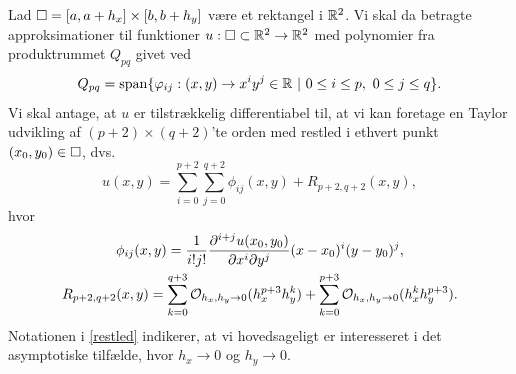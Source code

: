 Lad $\Box =[a,a+h_x]\times [b,b+h_y]$ være et rektangel i $\mathbb{R}^2$. Vi
skal da betragte approksimationer til funktioner $u:\Box\subset\mathbb{R}^2
\rightarrow \mathbb{R}^2$ med polynomier fra produktrummet $Q_{pq}$ givet ved
\begin{equation}
  Q_{pq} = \operatorname{span} \{\varphi_{ij} : (x,y)\rightarrow x^i y^j \in\mathbb{R} \ |\
  0\leq i\leq p, \ 0\leq j\leq q \}.
\end{equation}
Vi skal antage, at $u$ er tilstrækkelig differentiabel til, at vi kan
foretage en Taylor udvikling af $(p+2)\times(q+2)$'te orden med restled i
ethvert punkt $(x_0,y_0)\in\Box$, dvs.
\begin{equation}
  u(x,y) =  \sum_{i=0}^{p+2} \sum_{j=0}^{q+2} \phi_{ij}(x,y) +
  R_{p+2,q+2}(x,y),
\end{equation}
hvor
\begin{gather}
  \phi_{ij}(x,y) =
  \frac{1}{i!j!}\frac{\partial^{i+j}u(x_0,y_0)}{\partial x^i \partial y^j}
  (x-x_0)^i(y-y_0)^j, \\
  R_{p+2,q+2}(x,y) =
  \sum_{k=0}^{q+3} {\mathcal O}_{h_x,h_y\rightarrow 0} (h_x^{p+3}h_y^k) +
  \sum_{k=0}^{p+3} {\mathcal O}_{h_x,h_y\rightarrow 0} (h_x^kh_y^{p+3}). \label{restled}
\end{gather}
Notationen i \eqref{restled} indikerer, at vi hovedsageligt er interesseret i
det asymptotiske tilfælde, hvor $h_x \rightarrow 0$ og $h_y
\rightarrow 0$.

